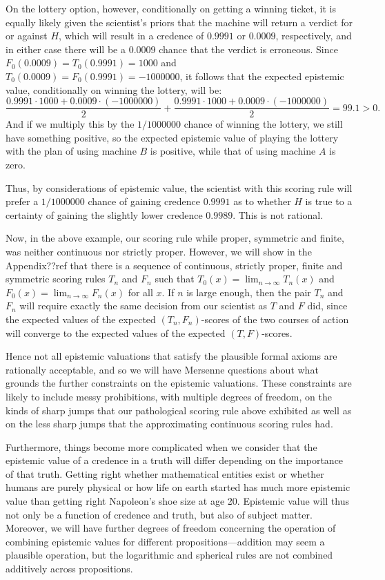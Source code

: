 On the lottery option, however, conditionally on getting a winning ticket, it is equally likely given the 
scientist's priors that the machine will return a verdict for or against $H$, which will result in a credence 
of $0.9991$ or $0.0009$, respectively, and in either case there will be a $0.0009$
chance that the verdict is erroneous. Since $F_0(0.0009)=T_0(0.9991)=1000$ and $T_0(0.0009)=F_0(0.9991)=-1000000$, it follows 
that the expected epistemic value, conditionally on winning the lottery, will be:
$$
    \frac{0.9991 \cdot 1000+0.0009\cdot (-1000000)}2+\frac{0.9991 \cdot 1000+0.0009\cdot (-1000000)}2 = 99.1 > 0.
$$
And if we multiply this by the $1/1000000$ chance of winning the lottery, we still have something positive, so
the expected epistemic value of playing the lottery with the plan of using machine $B$ is positive, while that of
using machine $A$ is zero. 

Thus, by considerations of epistemic value, the scientist with this scoring rule will prefer a $1/1000000$ chance of 
gaining credence $0.9991$ as to whether $H$ is true to a certainty of gaining the slightly lower credence $0.9989$.
This is not rational. 

Now, in the above example, our scoring rule while proper, symmetric and finite, was neither continuous nor strictly proper. 
However, we will show in the Appendix??ref that there is a sequence of continuous, strictly proper, finite and symmetric
scoring rules $T_n$ and $F_n$ such that $T_0(x)=\lim_{n\to\infty} T_n(x)$ and $F_0(x)=\lim_{n\to\infty} F_n(x)$ for all $x$.
If $n$ is large enough, then the pair $T_n$ and $F_n$ will require exactly the same decision from our scientist as 
$T$ and $F$ did, since the expected values of the expected $(T_n,F_n)$-scores of the two courses of action will converge
to the expected values of the expected $(T,F)$-scores.

Hence not all epistemic valuations that satisfy the plausible formal axioms are rationally acceptable, and so we 
will have Mersenne questions about what grounds the further constraints on the epistemic valuations. These constraints
are likely to include messy prohibitions, with multiple degrees of freedom, on the kinds of sharp jumps that our
pathological scoring rule above exhibited as well as on the less sharp jumps that the approximating continuous
scoring rules had.

Furthermore, things become more complicated when we consider that the epistemic value of a credence in a truth will
differ depending on the importance of that truth. Getting right whether mathematical entities exist or whether humans are 
purely physical or how life on earth started has much more epistemic value than getting right Napoleon's shoe size at age 20. Epistemic
value will thus not only be a function of credence and truth, but also of subject matter. Moreover, we will have 
further degrees of freedom concerning the operation of combining epistemic values for different propositions---addition
may seem a plausible operation, but the logarithmic and spherical rules are not combined additively across propositions.

